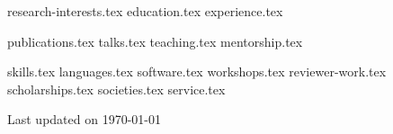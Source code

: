 \documentclass[letterpaper,13pt]{article}
\newcommand{\updateinfo}[1][\today]{\par\vfill\hfill{\normalsize\color{MidnightBlue}Last
updated on #1}}
\begin{document}


{research-interests.tex}
{education.tex}
{experience.tex}

{publications.tex}
{talks.tex}
{teaching.tex}
{mentorship.tex}

\sidebyside
{{skills.tex}}
{{languages.tex}}
{software.tex}
{workshops.tex}
{reviewer-work.tex}
{scholarships.tex}
{societies.tex}
{service.tex}

\updateinfo
\end{document}
